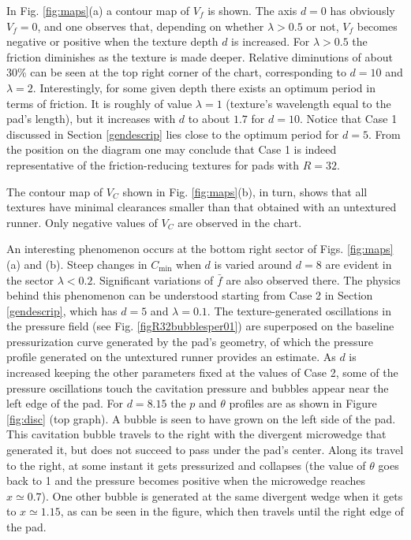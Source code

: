 In Fig. \ref{fig:maps}(a) a contour map of $V_f$ is shown.
The axis $d=0$ has obviously $V_f=0$, and one observes that,
depending on whether $\lambda > 0.5$ or not, $V_f$ becomes
negative or positive when the texture depth $d$ is increased.
For $\lambda > 0.5$ the friction diminishes as the texture
is made deeper. Relative diminutions of about 30\% can %
be seen at the top right corner of the chart, corresponding to
$d=10$ and $\lambda=2$. Interestingly, for some given depth
there exists an optimum period in terms of friction. It is
roughly of value $\lambda=1$ (texture's wavelength equal to the
pad's length), but it increases with $d$ to about $1.7$ for
$d=10$. Notice that Case 1 discussed in Section \ref{gendescrip}
lies close to the optimum period for $d=5$. From the
position on the diagram one may conclude that Case 1 is
indeed representative of the friction-reducing textures
for pads with $R=32$.

The contour map of $V_C$ shown in Fig. \ref{fig:maps}(b),
in turn, shows that all textures have minimal clearances smaller
than that obtained with an untextured runner. Only negative
values of $V_C$ are observed in the chart. 

An interesting
phenomenon occurs at the bottom right sector of Figs.
\ref{fig:maps}(a) and (b). Steep changes in $C_{\min}$
when $d$ is varied around $d=8$ are evident in the
sector $\lambda < 0.2$. Significant variations of
$\bar{f}$ are also observed there.  The physics behind
this phenomenon can be understood starting from
Case 2 in Section \ref{gendescrip}, which has $d=5$ and
$\lambda=0.1$. The texture-generated oscillations in the 
pressure field (see Fig. \ref{figR32bubblesper01}) are superposed
on the baseline pressurization curve generated by
the pad's geometry, of which the pressure profile 
generated on the untextured runner provides an estimate.
As $d$ is increased keeping the other parameters 
fixed at the values of Case 2, some of the pressure
oscillations touch the cavitation pressure and
bubbles appear near the left edge of the pad. For $d=8.15$
the $p$ and $\theta$ profiles are as shown in Figure \ref{fig:disc}
(top graph). A bubble is seen to have grown on the
left side of the pad. This cavitation bubble travels
to the right with the divergent microwedge that generated
it, but does not succeed to pass under the pad's center.
Along its travel to the right, at some instant it 
gets pressurized and collapses (the value of $\theta$
goes back to 1 and the pressure becomes positive when
the microwedge reaches $x \simeq 0.7$).
One other bubble is generated at the same divergent
wedge when it gets to $x \simeq 1.15$, as can be
seen in the figure, which then travels until the right
edge of the pad.

